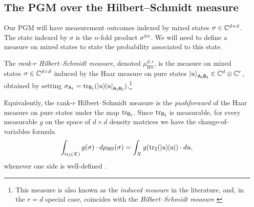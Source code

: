 \subsection{The PGM over the Hilbert--Schmidt measure} Our PGM will have measurement outcomes indexed by mixed states $\sigma \in \mathbb C^{d \times d}$. The state indexed by $\sigma$ is the $n$-fold product $\sigma^{\otimes n}$. We will need to define a measure on mixed states to state the probability associated to this state.  

\begin{definition}\label{def:HS-measure}
   The \emph{rank-$r$ Hilbert--Schmidt measure}, denoted $\mu^{d,r}_{\mathrm{HS}}$, is the measure on mixed states $\sigma \in \mathbb C^{d \times d}$ induced by the Haar measure on pure states $\ket{u}_{\mathsf{A_1B_1}} \in \mathbb C^d \otimes \mathbb C^r$, obtained by setting $\sigma_{\mathsf{A_1}} = \tr_{\mathsf{B_1}} ( \ketbra{u}_{\mathsf{A_1B_1}} )$.\footnote{This measure is also known as the \emph{induced measure} in the literature, and, in the $r = d$ special case, coincides with the \emph{Hilbert--Schmidt measure} \cite{ZS01}}
\end{definition}

Equivalently, the rank-$r$ Hilbert--Schmidt measure is the \emph{pushforward} of the Haar measure on pure states under the map $\tr_{\mathsf{B_1}}$. Since $\tr_{\mathsf{B_1}}$ is measurable, for every measurable $g$ on the space of $d\times d$ density matrices we have the change-of-variables formula
\begin{equation}\label{eq:pushfoward_change_of_variables}
\int_{\tr_{\mathsf{2}}(X)} g(\sigma) \cdot d\mu_{\mathrm{HS}}(\sigma) = \int_{X} g( \tr_{\mathsf{2}}(\ketbra{u} ) \cdot du,
\end{equation}
whenever one side is well-defined \cite[Theorem 3.6.1]{Bog07}.

